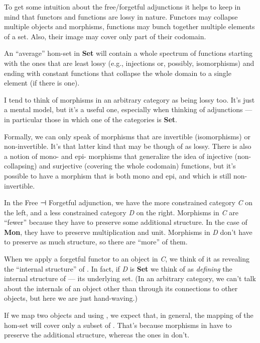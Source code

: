 To get some intuition about the free/forgetful adjunctions it helps to
keep in mind that functors and functions are lossy in nature. Functors
may collapse multiple objects and morphisms, functions may bunch
together multiple elements of a set. Also, their image may cover only
part of their codomain.

An ``average'' hom-set in \textbf{Set} will contain a whole spectrum of
functions starting with the ones that are least lossy (e.g., injections
or, possibly, isomorphisms) and ending with constant functions that
collapse the whole domain to a single element (if there is one).

I tend to think of morphisms in an arbitrary category as being lossy
too. It's just a mental model, but it's a useful one, especially when
thinking of adjunctions --- in particular those in which one of the
categories is \textbf{Set}.

Formally, we can only speak of morphisms that are invertible
(isomorphisms) or non-invertible. It's that latter kind that may be
though of as lossy. There is also a notion of mono- and epi- morphisms
that generalize the idea of injective (non-collapsing) and surjective
(covering the whole codomain) functions, but it's possible to have a
morphism that is both mono and epi, and which is still non-invertible.

In the Free ⊣ Forgetful adjunction, we have the more constrained
category \emph{C} on the left, and a less constrained category \emph{D}
on the right. Morphisms in \emph{C} are ``fewer'' because they have to
preserve some additional structure. In the case of \textbf{Mon}, they
have to preserve multiplication and unit. Morphisms in \emph{D} don't
have to preserve as much structure, so there are ``more'' of them.

When we apply a forgetful functor  to an object  in
\emph{C}, we think of it as revealing the ``internal structure'' of
. In fact, if \emph{D} is \textbf{Set} we think of 
as \emph{defining} the internal structure of  --- its
underlying set. (In an arbitrary category, we can't talk about the
internals of an object other than through its connections to other
objects, but here we are just hand-waving.)

If we map two objects  and  using ,
we expect that, in general, the mapping of the hom-set
 will cover only a subset of
. That's because morphisms in
 have to preserve the additional structure,
whereas the ones in  don't.

